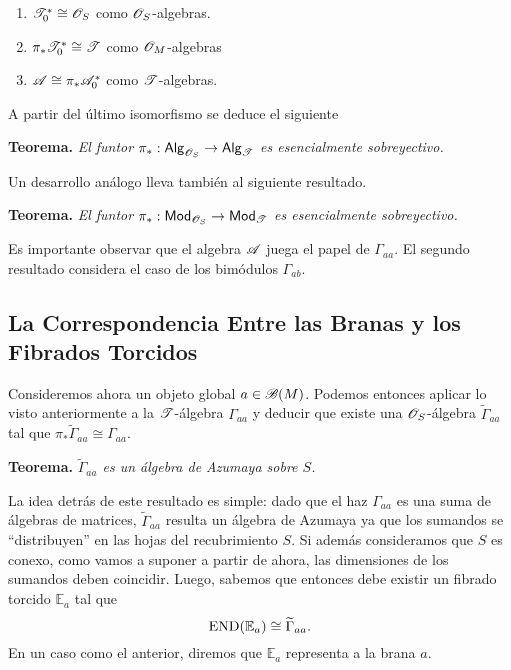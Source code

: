 {\begin{enumerate}
\item $\mathscr{T}_0^*\cong \mathscr{O}_S$ como $\mathscr{O}_S$-algebras.
\item $\pi_*\mathscr{T}_0^*\cong \mathscr{T}$ como $\mathscr{O}_M$-algebras
\item $\mathscr{A}\cong \pi_*\mathscr{A}_0^*$ como $\mathscr{T}$-algebras.
\end{enumerate}

A partir del \'ultimo isomorfismo se deduce el siguiente
\medskip

{\bf Teorema.} {\it El funtor $\pi_*:\mathsf{Alg}_{\mathscr{O}_S}\to \mathsf{Alg}_{\mathscr{T}}$ es esencialmente sobreyectivo.}
\medskip

Un desarrollo an\'alogo lleva tambi\'en al siguiente resultado.
\medskip

{\bf Teorema.} {\it El funtor $\pi_*:\mathsf{Mod}_{\mathscr{O}_S}\to \mathsf{Mod}_{\mathscr{T}}$ es esencialmente sobreyectivo.}
\medskip

Es importante observar que el algebra $\mathscr{A}$ juega el papel de $\Gamma_{aa}$. El segundo resultado considera el caso de los bim\'odulos $\Gamma_{ab}$.


\subsection{La Correspondencia Entre las Branas y los Fibrados Torcidos}

Consideremos ahora un objeto global $a\in \mathscr{B}(M)$. Podemos entonces aplicar lo visto anteriormente a la $\mathscr{T}$-\'algebra $\Gamma_{aa}$ y deducir que existe una $\mathscr{O}_S$-\'algebra $\widetilde{\Gamma}_{aa}$ tal que $\pi_*\widetilde{\Gamma}_{aa}\cong \Gamma_{aa}$.
\medskip

{\bf Teorema.} {\it $\widetilde{\Gamma}_{aa}$ es un \'algebra de Azumaya sobre $S$.}
\medskip

La idea detr\'as de este resultado es simple: dado que el haz $\Gamma_{aa}$ es una suma de \'algebras de matrices, $\widetilde{\Gamma}_{aa}$ resulta un \'algebra de Azumaya ya que los sumandos se ``distribuyen'' en las hojas del recubrimiento $S$. Si adem\'as consideramos que $S$ es conexo, como vamos a suponer a partir de ahora, las dimensiones de los sumandos deben coincidir. Luego, sabemos que entonces debe existir un fibrado torcido $\mathbb{E}_a$ tal que
$$\operatorname{END}(\mathbb{E}_a)\cong \widetilde{\Gamma}_{aa}.$$
En un caso como el anterior, diremos que $\mathbb{E}_a$ representa a la brana $a$.

}
